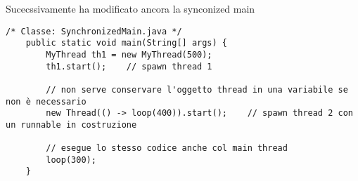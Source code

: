 \noindent Sucecssivamente ha modificato ancora la synconized main

\begin{lstlisting}[basicstyle=\small,]
/* Classe: SynchronizedMain.java */
    public static void main(String[] args) {
        MyThread th1 = new MyThread(500);
        th1.start();    // spawn thread 1

        // non serve conservare l'oggetto thread in una variabile se non è necessario
        new Thread(() -> loop(400)).start();    // spawn thread 2 con un runnable in costruzione

        // esegue lo stesso codice anche col main thread
        loop(300);  
    }

\end{lstlisting}










